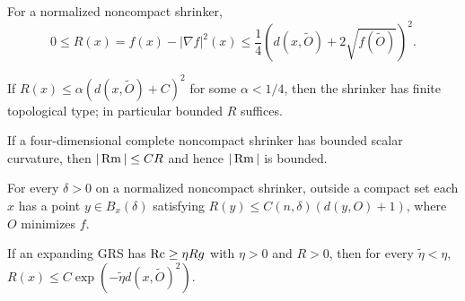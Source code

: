 \begin{lemma}
\label{lem:chow-iv-scalar-quadratic-upper}


For a normalized noncompact shrinker,
\[
0\le R(x)=f(x)-|\nabla f|^2(x)\le\frac14(d(x,\widetilde O)+2\sqrt{f(\widetilde O)})^2.
\]
\end{lemma}

\begin{corollary}
\label{cor:chow-iv-finite-topological-type}


If $R(x)\le\alpha(d(x,\widetilde O)+C)^2$ for some $\alpha<1/4$, then the
shrinker has finite topological type; in particular bounded $R$ suffices.
\end{corollary}

\begin{theorem}
\label{thm:chow-iv-four-dimensional-curvature}

If a four-dimensional complete noncompact shrinker has bounded scalar curvature,
then $|\operatorname{Rm}|\le C R$ and hence $|\operatorname{Rm}|$ is bounded.
\end{theorem}

\begin{lemma}
\label{lem:chow-iv-linear-net-scalar}

For every $\delta>0$ on a normalized noncompact shrinker, outside a compact set
each $x$ has a point $y\in B_x(\delta)$ satisfying
$R(y)\le C(n,\delta)(d(y,O)+1)$, where $O$ minimizes $f$.
\end{lemma}

\begin{proposition}
\label{prop:chow-iv-expander-curvature-decay}

If an expanding GRS has $\operatorname{Rc}\ge\eta Rg$ with $\eta>0$ and $R>0$, then for
every $\widetilde\eta<\eta$,
$R(x)\le C\exp(-\widetilde\eta d(x,\widetilde O)^2)$.
\end{proposition}

